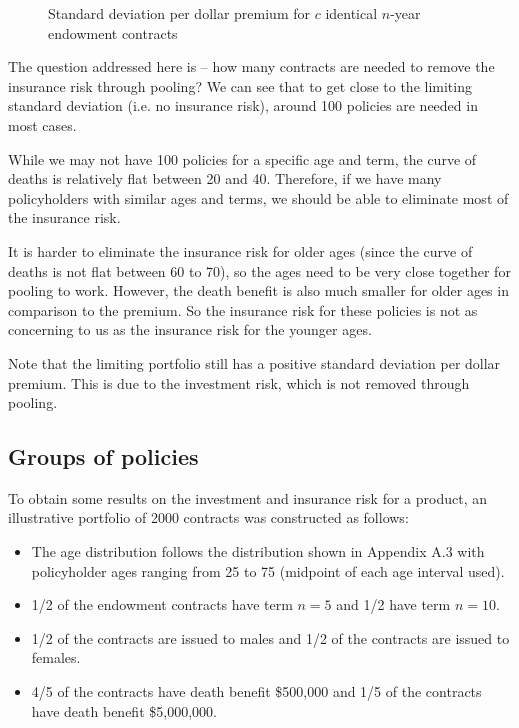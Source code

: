 \documentclass[12pt]{article}
\begin{document}
\begin{figure}[!htpb]
\begin{center}
{\begin{minipage}[b]{0.55\textwidth}
\begin{center}
\end{center}
\end{minipage}
}
\end{center}
\caption{Standard deviation per dollar premium for $c$ identical $n$-year endowment contracts}
\label{fig:portfoliosd}
\end{figure}

The question addressed here is -- how many contracts are needed to remove the insurance risk through pooling? We can see that to get close to the limiting standard deviation (i.e. no insurance risk), around 100 policies are needed in most cases.

While we may not have 100 policies for a specific age and term, the curve of deaths is relatively flat between 20 and 40. Therefore, if we have many policyholders with similar ages and terms, we should be able to eliminate most of the insurance risk. 

It is harder to eliminate the insurance risk for older ages (since the curve of deaths is not flat between 60 to 70), so the ages need to be very close together for pooling to work. However, the death benefit is also much smaller for older ages in comparison to the premium. So the insurance risk for these policies is not as concerning to us as the insurance risk for the younger ages.

Note that the limiting portfolio still has a positive standard deviation per dollar premium. This is due to the investment risk, which is not removed through pooling.

\subsection{Groups of policies}

To obtain some results on the investment and insurance risk for a product, an illustrative portfolio of 2000 contracts was constructed as follows:

\begin{itemize}
\item The age distribution follows the distribution shown in Appendix A.3 with policyholder ages ranging from 25 to 75 (midpoint of each age interval used).
\item 1/2 of the endowment contracts have term $n = 5$ and 1/2 have term $n = 10$.
\item 1/2 of the contracts are issued to males and 1/2 of the contracts are issued to females.
\item 4/5 of the contracts have death benefit \$500,000 and 1/5 of the contracts have death benefit \$5,000,000.
\end{itemize}
\end{document}
